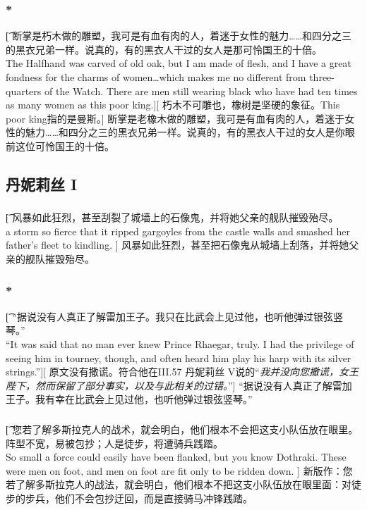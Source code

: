 \documentclass[12pt,a4paper]{article}
\begin{document}
\subsubsection{\color{red}*}\t[
	断掌是朽木做的雕塑，我可是有血有肉的人，着迷于女性的魅力……和四分之三的黑衣兄弟一样。说真的，有的黑衣人干过的女人是那可怜国王的十倍。\\
	The Halfhand was carved of old oak, but I am made of flesh, and I have a great fondness for the charms of women\ldots which makes me no different from three-quarters of the Watch. There are men still wearing black who have had ten times as many women as this poor king.][
	朽木不可雕也，橡树是坚硬的象征。This poor king指的是曼斯。]
	断掌是老橡木做的雕塑，我可是有血有肉的人，着迷于女性的魅力……和四分之三的黑衣兄弟一样。说真的，有的黑衣人干过的女人是你眼前这位可怜国王的十倍。
	
	
\subsection{丹妮莉丝 I}
\subsubsection{}\t[
	风暴如此狂烈，甚至刮裂了城墙上的石像鬼，并将她父亲的舰队摧毁殆尽。\\
	a storm so fierce that it ripped gargoyles from the castle walls and smashed her father's fleet to kindling. ]
	风暴如此狂烈，甚至把石像鬼从城墙上刮落，并将她父亲的舰队摧毁殆尽。
	
\subsubsection{\color{red}*}\t[
	 “据说没有人真正了解雷加王子。我只在比武会上见过他，也听他弹过银弦竖琴。”\\
	 “It was said that no man ever knew Prince Rhaegar, truly. I had the privilege of seeing him in tourney, though, and often heard him play his harp with its silver strings.”][
	 原文没有撒谎。符合他在III.57 丹妮莉丝 V说的“\emph{我并没向您撒谎，女王陛下，然而保留了部分事实，以及与此相关的过错。}”]
	 “据说没有人真正了解雷加王子。我有幸在比武会上见过他，也听他弹过银弦竖琴。”
	 
\subsubsection{}\t[
	您若了解多斯拉克人的战术，就会明白，他们根本不会把这支小队伍放在眼里。阵型不宽，易被包抄；人是徒步，将遭骑兵践踏。\\
	So small a force could easily have been flanked, but you know Dothraki. These were men on foot, and men on foot are fit only to be ridden down. ]
	新版作：您若了解多斯拉克人的战法，就会明白，他们根本不把这支小队伍放在眼里面：对徒步的步兵，他们不会包抄迂回，而是直接骑马冲锋践踏。
	
\end{document}
